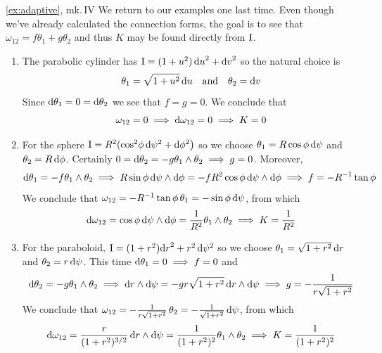 

\begin{examples*}{\ref{ex:adaptive}, mk.\,IV}{}
	We return to our examples one last time. Even though we've already calculated the connection forms, the goal is to see that $\omega_{12}=f\theta_1+g\theta_2$ and thus $K$ may be found directly from $\mathrm{I}$.
	\begin{enumerate}
	  \item The parabolic cylinder has $\mathrm{I}=(1+u^2)\,{\mathrm{d} u}^2+{\mathrm{d} v}^2$ so the natural choice is
	  \[
	  	\theta_1=\sqrt{1+u^2}\,{\mathrm{d} u}\quad\text{and}\quad \theta_2={\mathrm{d} v}
	  \]
	  Since $\mathrm{d}\theta_1=0=\mathrm{d}\theta_2$ we see that $f=g=0$.  We conclude that
	  \[
	  	\omega_{12}=0\implies \mathrm{d}\omega_{12}=0\implies K=0
	  \]
		
	  \item For the sphere $\mathrm{I}=R^2(\cos^2\!\phi\,\mathrm{d}\psi^2+\mathrm{d}\phi^2\bigr)$ so we choose $\theta_1=R\cos\phi\,\mathrm{d}\psi$ and $\theta_2=R\,\mathrm{d}\phi$. Certainly $0=\mathrm{d}\theta_2=-g\theta_1\wedge\theta_2\implies g=0$. Moreover,
	  \begin{gather*}
			\mathrm{d}\theta_1=-f\theta_1\wedge\theta_2\implies R\sin\phi\,\mathrm{d}\psi\wedge\mathrm{d}\phi=-fR^2\cos\phi\,\mathrm{d}\psi\wedge\mathrm{d}\phi\implies f=-R^{-1}\tan\phi
	  \end{gather*}
	  We conclude that $\omega_{12}=-R^{-1}\tan\phi\,\theta_1=-\sin\phi\,\mathrm{d}\psi$, from which
	  \[
	  	\mathrm{d}\omega_{12}=\cos\phi\,\mathrm{d}\psi\wedge\mathrm{d}\phi=\frac 1{R^2}\theta_1\wedge\theta_2\implies K=\frac 1{R^2}
	  \]
	  
	  \item For the paraboloid, $\mathrm{I}=(1+r^2){\mathrm{d} r}^2+r^2\,\mathrm{d}\psi^2$ so we choose $\theta_1=\sqrt{1+r^2}\,{\mathrm{d} r}$ and $\theta_2=r\,\mathrm{d}\psi$. This time $\mathrm{d}\theta_1=0\implies f=0$ and
	  \[
			\mathrm{d}\theta_2=-g\theta_1\wedge\theta_2\implies {\mathrm{d}r}\wedge\mathrm{d}\psi=-gr\sqrt{1+r^2}\,{\mathrm{d} r}\wedge\mathrm{d}\psi\implies g=-\frac{1}{r\sqrt{1+r^2}}
	  \]
	  We conclude that $\omega_{12}=-\frac{1}{r\sqrt{1+r^2}}\,\theta_2=-\frac{1}{\sqrt{1+r^2}}\,\mathrm{d}\psi$, from which
	  \[
	  	\mathrm{d}\omega_{12}=\frac{r}{(1+r^2)^{3/2}}\,{\mathrm{d} r}\wedge\mathrm{d}\psi=\frac 1{(1+r^2)^2}\theta_1\wedge\theta_2\implies K=\frac 1{(1+r^2)^2}
	  \]
	\end{enumerate}
\end{examples*}



